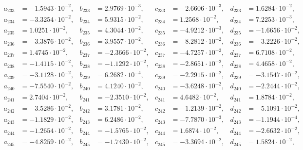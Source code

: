 \begin{align*}
  a_{ 233 } &= -1.5943 \cdot 10^{ -2 }, & b_{ 233 } &= 2.9769 \cdot 10^{ -3 }, & c_{ 233 } &= -2.6606 \cdot 10^{ -3 }, & d_{ 233 } &= 1.6284 \cdot 10^{ -2 }, \\ 
  a_{ 234 } &= -3.3254 \cdot 10^{ -2 }, & b_{ 234 } &= 5.9315 \cdot 10^{ -2 }, & c_{ 234 } &= 1.2568 \cdot 10^{ -2 }, & d_{ 234 } &= 7.2253 \cdot 10^{ -3 }, \\ 
  a_{ 235 } &= 1.0251 \cdot 10^{ -2 }, & b_{ 235 } &= 4.3044 \cdot 10^{ -2 }, & c_{ 235 } &= -4.9212 \cdot 10^{ -3 }, & d_{ 235 } &= -1.6656 \cdot 10^{ -2 }, \\ 
  a_{ 236 } &= -3.3876 \cdot 10^{ -2 }, & b_{ 236 } &= 3.9557 \cdot 10^{ -2 }, & c_{ 236 } &= -8.2812 \cdot 10^{ -2 }, & d_{ 236 } &= -3.2226 \cdot 10^{ -2 }, \\ 
  a_{ 237 } &= 1.4745 \cdot 10^{ -2 }, & b_{ 237 } &= -2.3666 \cdot 10^{ -2 }, & c_{ 237 } &= -4.7257 \cdot 10^{ -2 }, & d_{ 237 } &= 6.7108 \cdot 10^{ -2 }, \\ 
  a_{ 238 } &= -1.4115 \cdot 10^{ -2 }, & b_{ 238 } &= -1.1292 \cdot 10^{ -2 }, & c_{ 238 } &= -2.8651 \cdot 10^{ -2 }, & d_{ 238 } &= 4.4658 \cdot 10^{ -2 }, \\ 
  a_{ 239 } &= -3.1128 \cdot 10^{ -2 }, & b_{ 239 } &= 6.2682 \cdot 10^{ -4 }, & c_{ 239 } &= -2.2915 \cdot 10^{ -2 }, & d_{ 239 } &= -3.1547 \cdot 10^{ -2 }, \\ 
  a_{ 240 } &= -7.5540 \cdot 10^{ -2 }, & b_{ 240 } &= 4.1240 \cdot 10^{ -2 }, & c_{ 240 } &= -3.6248 \cdot 10^{ -2 }, & d_{ 240 } &= -2.2444 \cdot 10^{ -2 }, \\ 
  a_{ 241 } &= 2.7404 \cdot 10^{ -2 }, & b_{ 241 } &= -2.3510 \cdot 10^{ -2 }, & c_{ 241 } &= 4.6482 \cdot 10^{ -2 }, & d_{ 241 } &= 1.8784 \cdot 10^{ -2 }, \\ 
  a_{ 242 } &= -3.5286 \cdot 10^{ -2 }, & b_{ 242 } &= 3.1781 \cdot 10^{ -2 }, & c_{ 242 } &= -1.2139 \cdot 10^{ -2 }, & d_{ 242 } &= -5.1091 \cdot 10^{ -2 }, \\ 
  a_{ 243 } &= -1.1829 \cdot 10^{ -2 }, & b_{ 243 } &= 6.2486 \cdot 10^{ -2 }, & c_{ 243 } &= -7.7870 \cdot 10^{ -3 }, & d_{ 243 } &= -1.1944 \cdot 10^{ -4 }, \\ 
  a_{ 244 } &= -1.2654 \cdot 10^{ -2 }, & b_{ 244 } &= -1.5765 \cdot 10^{ -2 }, & c_{ 244 } &= 1.6874 \cdot 10^{ -2 }, & d_{ 244 } &= -2.6632 \cdot 10^{ -2 }, \\ 
  a_{ 245 } &= -4.8259 \cdot 10^{ -2 }, & b_{ 245 } &= -1.7430 \cdot 10^{ -2 }, & c_{ 245 } &= -3.3694 \cdot 10^{ -2 }, & d_{ 245 } &= 1.5824 \cdot 10^{ -2 }, \\ 

\end{align*}

